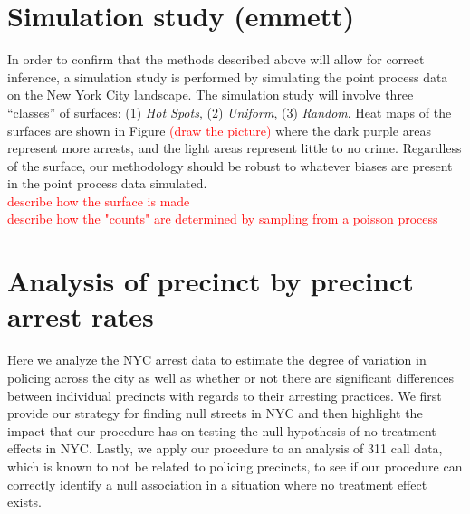 \documentclass[a4paper,11pt]{article}
\begin{document}
\section{Simulation study (emmett)}
In order to confirm that the methods described above will allow for correct inference, a simulation study is performed by simulating the point process data on the New York City landscape. The simulation study will involve three ``classes'' of surfaces: (1) \textit{Hot Spots}, (2) \textit{Uniform}, (3) \textit{Random}. Heat maps of the surfaces are shown in Figure \textcolor{red}{(draw the picture)}  where the dark purple areas represent more arrests, and the light areas represent little to no crime. Regardless of the surface, our methodology should be robust to whatever biases are present in the point process data simulated.\\
\textcolor{red}{describe how the surface is made}\\
\textcolor{red}{describe how the "counts" are determined by sampling from a poisson process}\\





\section{Analysis of precinct by precinct arrest rates}

Here we analyze the NYC arrest data to estimate the degree of variation in policing across the city as well as whether or not there are significant differences between individual precincts with regards to their arresting practices. We first provide our strategy for finding null streets in NYC and then highlight the impact that our procedure has on testing the null hypothesis of no treatment effects in NYC. Lastly, we apply our procedure to an analysis of 311 call data, which is known to not be related to policing precincts, to see if our procedure can correctly identify a null association in a situation where no treatment effect exists. 
\end{document}
